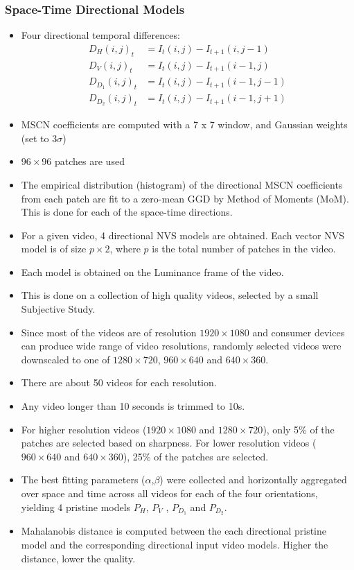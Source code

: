 \documentclass{article}
\begin{document}
    \subsubsection{Space-Time Directional Models}\label{subsubsec:Spatio_Temporal_Measures_Of_Naturalness:space-time-directional-models}
    \begin{itemize}
        \item Four directional temporal differences:
        \begin{align}
            D_H(i,j)_t &= I_t(i,j) - I_{t+1}(i, j-1) \\
            D_V(i,j)_t &= I_t(i,j) - I_{t+1}(i-1, j) \\
            D_{D_1}(i,j)_t &= I_t(i,j) - I_{t+1}(i-1, j-1) \\
            D_{D_2}(i,j)_t &= I_t(i,j) - I_{t+1}(i-1, j+1)
        \end{align}
        \item MSCN coefficients are computed with a 7 x 7 window, and Gaussian weights (set to $3 \sigma$)
        \item $96 \times 96$ patches are used
        \item The empirical distribution (histogram) of the directional MSCN coefficients from each patch are fit to a zero-mean GGD by Method of Moments (MoM).
        This is done for each of the space-time directions.
        \item For a given video, 4 directional NVS models are obtained.
        Each vector NVS model is of size $p \times 2$, where $p$ is the total number of patches in the video.
        \item Each model is obtained on the Luminance frame of the video.
        \item This is done on a collection of high quality videos, selected by a small Subjective Study.
        \item Since most of the videos are of resolution $1920 \times 1080$ and consumer devices can produce wide range of video resolutions, randomly selected videos were downscaled to one of $1280 \times 720$, $960 \times 640$ and $640 \times 360$.
        \item There are about 50 videos for each resolution.
        \item Any video longer than 10 seconds is trimmed to 10s.
        \item For higher resolution videos ($1920 \times 1080$ and $1280 \times 720$), only 5\% of the patches are selected based on sharpness.
        For lower resolution videos ($960 \times 640$ and $640 \times 360$), 25\% of the patches are selected.
        \item The best fitting parameters ($\alpha$,$\beta$) were collected and horizontally aggregated over space and time across all videos for each of the four orientations, yielding 4 pristine models $P_H$, $P_V$ , $P_{D_1}$ and $P_{D_2}$.
        \item Mahalanobis distance is computed between the each directional pristine model and the corresponding directional input video models.
        Higher the distance, lower the quality.
    \end{itemize}
\end{document}
